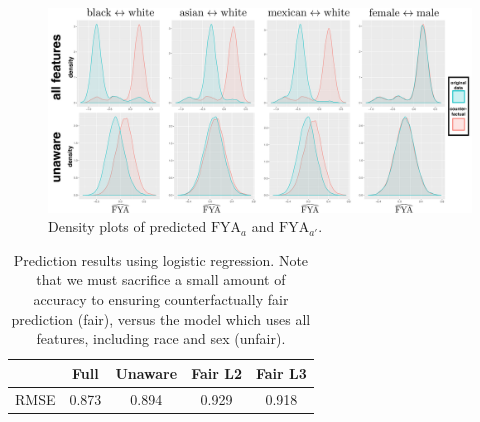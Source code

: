 \begin{figure}[th]
\begin{center}
 \label{figure.counterfactual}
\vspace{-1ex}
\centerline{\includegraphics[width=\columnwidth]{counterfactual}}
\vspace{-2ex}
\caption{Density plots of predicted $\mbox{FYA}_a$ and $\mbox{FYA}_{a'}$.}
\vspace{-2ex}
\end{center}
\end{figure}



\begin{table}
\centering
\caption{Prediction results using logistic regression. Note that we must sacrifice a small amount of accuracy to ensuring counterfactually fair prediction (fair), versus the model which uses all features, including race and sex (unfair).}\label{table.pred_law}
\begin{tabular}{ccccc} 
\hline
 &  {\bf Full} & {\bf Unaware} & {\bf Fair L2} & {\bf Fair L3} \\
\hline
RMSE & 0.873 & 0.894 & 0.929 & 0.918 \\
\hline
\end{tabular}
\end{table}



